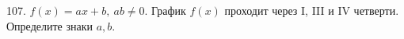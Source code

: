 107. $f(x)=ax+b,\ ab\neq 0.$ График $f(x)$ проходит через I, III и IV четверти. Определите знаки $a,b.$\\
